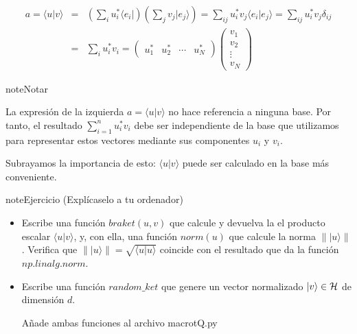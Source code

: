 \documentclass[letterpaper,10pt,english]{jupyterBook}
\newcommand{\bra}[1]{\langle #1|}
\newcommand{\ket}[1]{|#1\rangle}
\newcommand{\braket}[2]{\langle #1|#2\rangle}
\newcommand{\Hil}{{\cal H}}
\begin{document}
\begin{eqnarray*}
a = 
\braket{u}{v}&=& \left(\sum_{i}u_i^*\bra{e_i}\right)\left(\sum_{j}v_j\ket{e_j} \right) = 
\sum_{ij} u_i^* v_j  \braket{e_i}{e_j}
=
\sum_{ij} u_i^* v_j \delta_{ij} 
\\
&=&\sum_{i} u_i^* v_i =
  \begin{pmatrix}
{u_1^*} & {u_2^*} & \cdots & {u_N^*}
\end{pmatrix}\begin{pmatrix} {v_1}\\ {v_2}\\ \vdots \\ {v_N} 
\end{pmatrix}
\end{eqnarray*}

\begin{sphinxadmonition}{note}{Notar}

\sphinxAtStartPar
La expresión de la izquierda  \(a = \braket{u}{v}\) no hace referencia a ninguna base. Por tanto, el resultado \(\sum_{i=1}^n{ u_i^* v_i} \) debe ser independiente de la base que utilizamos para representar estos vectores mediante sus componentes \(u_i\) y \(v_i\).

\sphinxAtStartPar
Subrayamos la importancia de esto: \(\braket{u}{v}\) puede ser calculado en la base más conveniente.
\end{sphinxadmonition}

\begin{sphinxadmonition}{note}{Ejercicio (Explícaselo a tu ordenador) }
\begin{itemize}
\item {} 
\sphinxAtStartPar
Escribe una función \(braket(u,v)\) que calcule y devuelva la el producto escalar \(\braket{u}{v}\), y, con ella, una función \(norm(u)\) que calcule la norma \(\| \ket{u}\|\).
Verifica que \(\| \ket{u}\| = \sqrt{\braket{u}{u}}\) coincide con el resultado que da la función \(np.linalg.norm\).

\item {} 
\sphinxAtStartPar
Escribe una función \(random\_ket\) que genere un vector normalizado  \(\ket{v}\in\Hil\) de dimensión \(d\).

\sphinxAtStartPar
Añade ambas funciones al archivo macrotQ.py

\end{itemize}
\end{sphinxadmonition}
\end{document}
